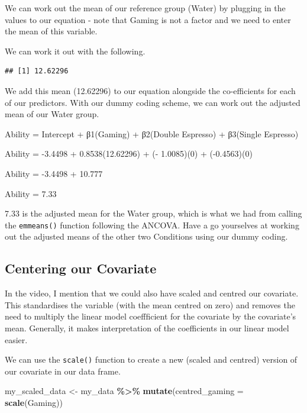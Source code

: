 \documentclass[
]{book}
\newenvironment{Shaded}{\begin{snugshade}}{\end{snugshade}}
\newcommand{\AttributeTok}[1]{\textcolor[rgb]{0.13,0.29,0.53}{#1}}
\newcommand{\FunctionTok}[1]{\textcolor[rgb]{0.13,0.29,0.53}{\textbf{#1}}}
\newcommand{\NormalTok}[1]{#1}
\newcommand{\OtherTok}[1]{\textcolor[rgb]{0.56,0.35,0.01}{#1}}
\newcommand{\SpecialCharTok}[1]{\textcolor[rgb]{0.81,0.36,0.00}{\textbf{#1}}}
\begin{document}
We can work out the mean of our reference group (Water) by plugging in the values to our equation - note that Gaming is not a factor and we need to enter the mean of this variable.

We can work it out with the following.

\begin{Shaded}
\end{Shaded}

\begin{verbatim}
## [1] 12.62296
\end{verbatim}

We add this mean (12.62296) to our equation alongside the co-efficients for each of our predictors. With our dummy coding scheme, we can work out the adjusted mean of our Water group.

Ability = Intercept + β1(Gaming) + β2(Double Espresso) + β3(Single Espresso)

Ability = -3.4498 + 0.8538(12.62296) + (- 1.0085)(0) + (-0.4563)(0)

Ability = -3.4498 + 10.777

Ability = 7.33

7.33 is the adjusted mean for the Water group, which is what we had from calling the \texttt{emmeans()} function following the ANCOVA. Have a go yourselves at working out the adjusted means of the other two Conditions using our dummy coding.

\hypertarget{centering-our-covariate}{%
\subsection{Centering our Covariate}\label{centering-our-covariate}}

In the video, I mention that we could also have scaled and centred our covariate. This standardises the variable (with the mean centred on zero) and removes the need to multiply the linear model coeffficient for the covariate by the covariate's mean. Generally, it makes interpretation of the coefficients in our linear model easier.

We can use the \texttt{scale()} function to create a new (scaled and centred) version of our covariate in our data frame.

\begin{Shaded}
\begin{Highlighting}[]
\NormalTok{my\_scaled\_data }\OtherTok{\textless{}{-}}\NormalTok{ my\_data }\SpecialCharTok{\%\textgreater{}\%}
  \FunctionTok{mutate}\NormalTok{(}\AttributeTok{centred\_gaming =} \FunctionTok{scale}\NormalTok{(Gaming))}
\end{Highlighting}
\end{Shaded}
\end{document}
